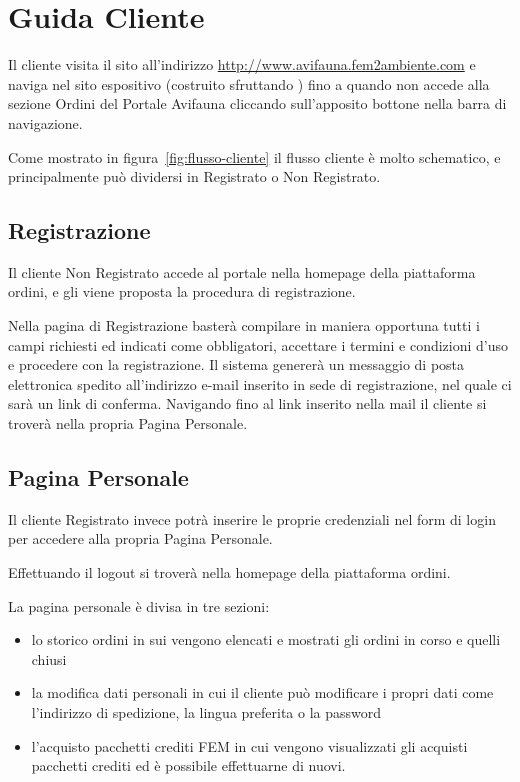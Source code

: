 \chapter{Guida Cliente}
\label{app:cliente}
Il cliente visita il sito all'indirizzo \url{http://www.avifauna.fem2ambiente.com} e naviga nel sito espositivo (costruito sfruttando {\wp}) fino a quando non accede alla sezione \textsf{Ordini} del Portale Avifauna cliccando sull'apposito bottone nella barra di navigazione.

Come mostrato in figura~\ref{fig:flusso-cliente} il flusso cliente è molto schematico, e principalmente può dividersi in \textsf{Registrato} o \textsf{Non Registrato}.

\section*{Registrazione}
Il cliente \textsf{Non Registrato} accede al portale nella homepage della piattaforma ordini, e gli viene proposta la procedura di registrazione.

Nella pagina di \textsf{Registrazione} basterà compilare in maniera opportuna tutti i campi richiesti ed indicati come obbligatori, accettare i termini e condizioni d'uso e procedere con la registrazione. Il sistema genererà un messaggio di posta elettronica spedito all'indirizzo e-mail inserito in sede di registrazione, nel quale ci sarà un link di conferma. Navigando fino al link inserito nella mail il cliente si troverà nella propria \textsf{Pagina Personale}.

\section*{Pagina Personale}
Il cliente \textsf{Registrato} invece potrà inserire le proprie credenziali nel form di login per accedere alla propria \textsf{Pagina Personale}.

Effettuando il \textsf{logout} si troverà nella homepage della piattaforma ordini.

La pagina personale è divisa in tre sezioni: 
\begin{itemize}
 \item lo \textsf{storico ordini} in sui vengono elencati e mostrati gli ordini in corso e quelli chiusi
 \item la \textsf{modifica dati personali} in cui il cliente può modificare i propri dati come l'indirizzo di spedizione, la lingua preferita o la password
 \item l'acquisto \textsf{pacchetti crediti FEM} in cui vengono visualizzati gli acquisti pacchetti crediti ed è possibile effettuarne di nuovi.
\end{itemize}

